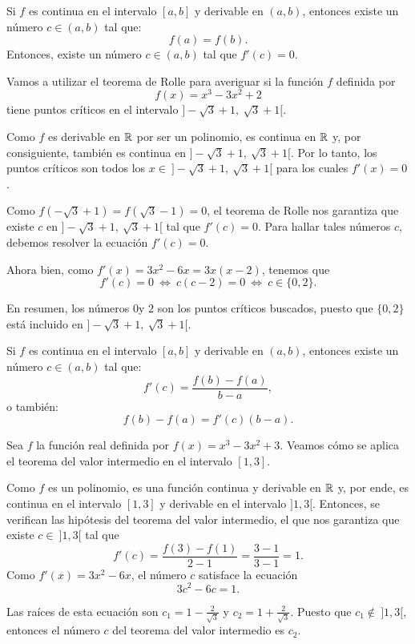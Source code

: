 \begin{teocal}
Si $f $ es continua en el intervalo $[a,b]$ y derivable en $(a,b)$, entonces existe un número $c\in
(a,b)$ tal que:
\[
f(a) = f(b).
\]
Entonces, existe un número $c\in (a,b)$ tal que $f'(c) = 0$.
\end{teocal}

\begin{exemplo}[]{}
Vamos a utilizar el teorema de Rolle para averiguar si la función $f$ definida por
\[
f(x) = x^3 - 3x^2 + 2
\]
tiene puntos críticos en el intervalo $]-\sqrt{3} + 1,\ \sqrt{3} + 1[$.

Como $f$ es derivable en $\mathbb{R}$ por ser un polinomio, es continua en $\mathbb{R}$ y, por consiguiente,
también es continua en $]-\sqrt{3} + 1,\ \sqrt{3} + 1[$. Por lo tanto, los puntos críticos son
todos los $x\in\ ]-\sqrt{3} + 1,\ \sqrt{3} + 1[$ para los cuales $f'(x) = 0$.

Como $f(-\sqrt{3} + 1) = f(\sqrt{3} - 1) = 0$, el teorema de Rolle nos garantiza que existe $c$ en
$]-\sqrt{3} + 1,\ \sqrt{3} + 1[$ tal que $f'(c) = 0$. Para hallar tales números $c$, debemos
resolver la ecuación $f'(c) = 0$.

Ahora bien, como $f'(x) = 3x^2 - 6x = 3x(x - 2)$, tenemos que
\[
f'(c) = 0 \ \Longleftrightarrow \ c(c - 2) = 0 \ \Longleftrightarrow \ c \in\{0,2\}.
\]

En resumen, los números $0$y $2$ son los puntos críticos buscados, puesto que $\{0,2\}$ está
incluido en $]-\sqrt{3} + 1,\ \sqrt{3} + 1[$.
\end{exemplo}

\begin{teocal}
Si $f $ es continua en el intervalo $[a,b]$ y derivable en $(a,b)$, entonces existe un número $c\in
(a,b)$ tal que:
\begin{equation*}
	f'(c)=\frac{f(b)-f(a)}{b-a},
\end{equation*}
o también:
\[
   f(b) - f(a) = f'(c)(b - a).
\]
\end{teocal}

\begin{exemplo}[]{}
Sea $f$ la función real definida por $f(x) = x^3 - 3x^2 + 3$. Veamos cómo se aplica el teorema del
valor intermedio en el intervalo $[1,3]$.

Como $f$ es un polinomio, es una función continua y derivable en $\mathbb{R}$ y, por ende, es continua en
el intervalo $[1,3]$ y derivable en el intervalo $]1,3[$. Entonces, se verifican las hipótesis del
teorema del valor intermedio, el que nos garantiza que existe $c\in\ ]1,3[$ tal que
\[
f'(c) = \frac{f(3) - f(1)}{2 - 1} = \frac{3 - 1}{3 - 1} = 1.
\]
Como $f'(x) = 3x^2 - 6x$, el número $c$ satisface la ecuación
\[
3c^2 - 6c = 1.
\]

Las raíces de esta ecuación son $c_1 = 1 - \frac{2}{\sqrt{3}}$ y $c_2 = 1 + \frac{2}{\sqrt{3}}$.
Puesto que $c_1\not\in\ ]1,3[$, entonces el número $c$ del teorema del valor intermedio es $c_2$.
\end{exemplo}

